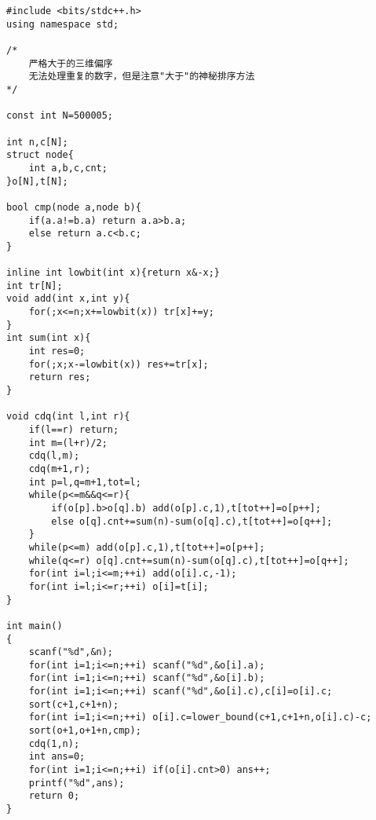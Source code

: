 \begin{lstlisting}
#include <bits/stdc++.h>
using namespace std;

/*
    严格大于的三维偏序
	无法处理重复的数字，但是注意"大于"的神秘排序方法
*/

const int N=500005;

int n,c[N];
struct node{
	int a,b,c,cnt;
}o[N],t[N];

bool cmp(node a,node b){
	if(a.a!=b.a) return a.a>b.a;
	else return a.c<b.c;
}

inline int lowbit(int x){return x&-x;}
int tr[N];
void add(int x,int y){
	for(;x<=n;x+=lowbit(x)) tr[x]+=y;
}
int sum(int x){
	int res=0;
	for(;x;x-=lowbit(x)) res+=tr[x];
	return res;
}

void cdq(int l,int r){
	if(l==r) return;
	int m=(l+r)/2;
	cdq(l,m);
	cdq(m+1,r);
	int p=l,q=m+1,tot=l;
	while(p<=m&&q<=r){
		if(o[p].b>o[q].b) add(o[p].c,1),t[tot++]=o[p++];
		else o[q].cnt+=sum(n)-sum(o[q].c),t[tot++]=o[q++];
	}
	while(p<=m) add(o[p].c,1),t[tot++]=o[p++];
	while(q<=r) o[q].cnt+=sum(n)-sum(o[q].c),t[tot++]=o[q++];
	for(int i=l;i<=m;++i) add(o[i].c,-1);
	for(int i=l;i<=r;++i) o[i]=t[i];
}

int main()
{
	scanf("%d",&n);
	for(int i=1;i<=n;++i) scanf("%d",&o[i].a);
	for(int i=1;i<=n;++i) scanf("%d",&o[i].b);
	for(int i=1;i<=n;++i) scanf("%d",&o[i].c),c[i]=o[i].c;
	sort(c+1,c+1+n);
	for(int i=1;i<=n;++i) o[i].c=lower_bound(c+1,c+1+n,o[i].c)-c;
	sort(o+1,o+1+n,cmp);
	cdq(1,n);
	int ans=0;
	for(int i=1;i<=n;++i) if(o[i].cnt>0) ans++;
	printf("%d",ans);
	return 0;
}
\end{lstlisting}